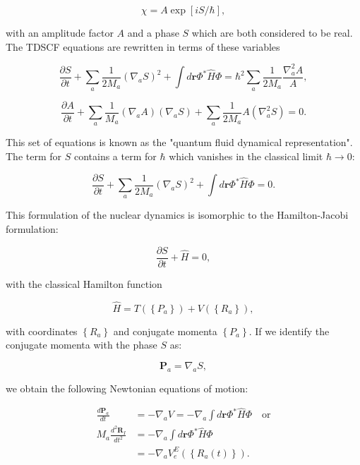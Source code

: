 \begin{equation}
 \chi = A \exp[iS/\hbar] , 
\end{equation}

with an amplitude factor $A$ and a phase $S$
which are both considered to be real.
The TDSCF equations are rewritten in terms of these variables

\begin{equation}
 \frac{\partial S}{\partial t} + \sum_a \frac{1}{2M_a}
    (\nabla_a S)^2 + \int d\bm{r} \Phi^* \hat{H} \Phi
    = \hbar^2 \sum_a \frac{1}{2M_a} \frac{\nabla_a^2 A}{A} , 
\end{equation}

\begin{equation}
 \frac{\partial A}{\partial t} + \sum_a \frac{1}{M_a} (\nabla_a A)
    (\nabla_a S) + \sum_a \frac{1}{2M_a} A (\nabla_a^2 S) = 0 . 
\end{equation}

This set of equations is known as the "quantum fluid dynamical representation".
The term for $S$ contains a term for $\hbar$ which vanishes in
the classical limit $\hbar \rightarrow 0$:

\begin{equation}
 \frac{\partial S}{\partial t} + \sum_a \frac{1}{2M_a}
    (\nabla_a S)^2 + \int d\bm{r} \Phi^* \hat{H} \Phi = 0 . 
\end{equation}

This formulation of the nuclear dynamics is isomorphic
to the Hamilton-Jacobi formulation:

\begin{equation}
 \frac{\partial S}{\partial t} + \hat{H} = 0 , 
\end{equation}

with the classical Hamilton function

\begin{equation}
 \hat{H} = T(\left\{P_a\right\}) + V(\left\{R_a\right\}) , 
\end{equation}

with coordinates $\left\{R_a\right\}$ and conjugate momenta 
$\left\{P_a\right\}$.
If we identify the conjugate momenta with the phase $S$ as:

\begin{equation}
 \bm{P}_a = \nabla_a S , 
\end{equation}

we obtain the following Newtonian equations of motion:

\begin{equation}
    \begin{split}
        \frac{d\bm{P}_a}{dt}
    &= -\nabla_a V
    = -\nabla_a \int d\bm{r} \Phi^* \hat{H} \Phi \quad \text{or} \\
        M_a\frac{d^2 \bm{R}_I}{dt^2}
    &= -\nabla_a \int d\bm{r} \Phi^* \hat{H} \Phi \\
    &= -\nabla_a V_e^E \left(\left\{ R_a(t) \right\}\right) .
    \end{split}
\end{equation}

